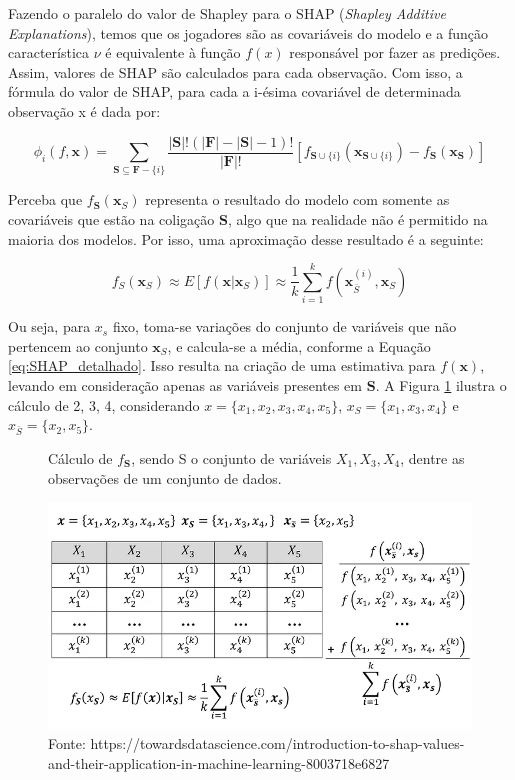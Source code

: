 Fazendo o paralelo do valor de Shapley para o SHAP (\textit{Shapley Additive Explanations}), 
temos que os jogadores são as covariáveis do modelo e a função característica $\nu$ é equivalente à função $f(x)$
 responsável por fazer as predições.
 Assim, valores de SHAP são calculados para cada observação. Com isso, a fórmula do valor
  de SHAP, para cada a i-ésima covariável de determinada observação x é dada por:

\begin{equation}
\phi_i(f,\textbf{x})= 
\sum_{\textbf{S} \subseteq  \textbf{F} - \{i\}}
\frac{|\textbf{S}|!(|\textbf{F}| - |\textbf{S}| - 1)!}{|\textbf{F}|!}
[f_{\textbf{S}\cup\{i\}}(\textbf{x}_{\textbf{S}\cup\{i\}}) - f_{\textbf{S}}(\textbf{x}_{\textbf{S}})
]
\label{eq:SHAP}
\end{equation}

Perceba que $f_\textbf{S}(\textbf{x}_S)$ representa o resultado do modelo com somente as covariáveis
 que estão na coligação $\textbf{S}$, algo que na realidade não é permitido na maioria dos modelos. 
 Por isso, uma aproximação desse resultado é a seguinte:

\begin{equation}    
f_S(\textbf{x}_S) \approx E[f(\textbf{x}|\textbf{x}_S)] \approx 
\frac{1}{k} \sum_{i=1}^{k}
f(\textbf{x}_{\bar{S}}^{(i)}, \textbf{x}_S)
\label{eq:SHAP_detalhado}
\end{equation}

Ou seja, para $x_s$ fixo, toma-se variações do conjunto de variáveis que não pertencem ao conjunto $\textbf{x}_S$,
e calcula-se a média, conforme a Equação
\ref{eq:SHAP_detalhado}. Isso resulta na criação de uma
estimativa para $f(\textbf{x})$, levando em consideração apenas as variáveis presentes em $\textbf{S}$.
A Figura \ref{fig:calculo_esforço} ilustra o cálculo de 2, 3, 4, considerando $x = \{ x_1, x_2, x_3, x_4, x_5\}$,
$x_S = \{x_1, x_3, x_4\}$ e $x_{\bar{S}} = \{x_2, x_5\}$.


\begin{figure}[H]
    \centering
    \caption{Cálculo de $f_{\textbf{S}}$, sendo S o conjunto de variáveis $X_1, X_3, X_4$, dentre as observações de um conjunto de dados.}
    \includegraphics[scale=0.5]{imagens/shap_explicado.png}
    \caption*{Fonte: https://towardsdatascience.com/introduction-to-shap-values-and-their-application-in-machine-learning-8003718e6827}
    \label{fig:calculo_esforço}   
\end{figure}

